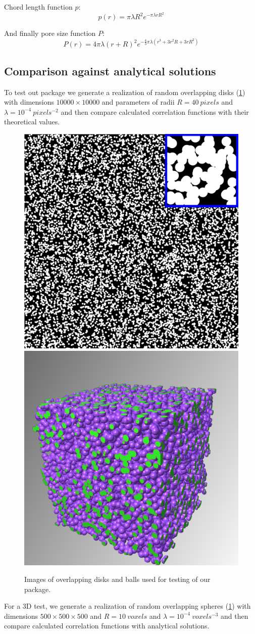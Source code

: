 \documentclass[1p]{elsarticle}
\begin{document}
Chord length function $p$:
\begin{equation*}
  p(r) = \pi\lambda R^2 e^{-\pi\lambda rR^2}
\end{equation*}

And finally pore size function $P$:
\begin{equation*}
  P(r) = 4\pi\lambda(r+R)^2 e^{-\frac{4}{3}\pi\lambda (r^3 + 3r^2R + 3rR^2)}
\end{equation*}

\subsection{Comparison against analytical solutions}
To test out package we generate a realization of random overlapping disks
(\cref{fig:overlapping-disks}) with dimensions $10000 \times 10000$ and
parameters of radii $R = 40\ pixels$ and $\lambda = 10^{-4}\ pixels^{-2}$ and
then compare calculated correlation functions with their theoretical values.
\begin{figure}[ht]
  \centering
  \includegraphics[width=0.45\linewidth]{images/disks.png}
  \includegraphics[width=0.45\linewidth]{images/balls.png}
  \caption[]{Images of overlapping disks and balls used for testing of our package.}
  \label{fig:overlapping-disks}
\end{figure}

For a 3D test, we generate a realization of random overlapping spheres
(\cref{fig:overlapping-disks}) with dimensions $500 \times 500 \times 500$ and
$R = 10\ voxels$ and $\lambda = 10^{-4}\ voxels^{-3}$ and then compare calculated
correlation functions with analytical solutions. 
\end{document}
